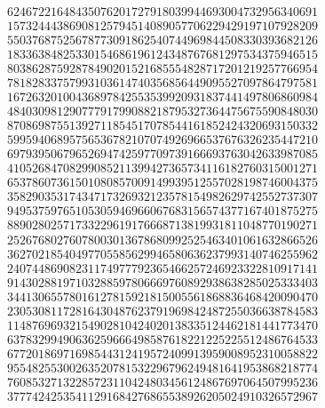 \begin{ProjectEuler}{13}
\begin{multicols}{2}
\begin{align*}
	62467221648435076201727918039944693004732956340691 \\
	15732444386908125794514089057706229429197107928209 \\
	55037687525678773091862540744969844508330393682126 \\
	18336384825330154686196124348767681297534375946515 \\
	80386287592878490201521685554828717201219257766954 \\
	78182833757993103614740356856449095527097864797581 \\
	16726320100436897842553539920931837441497806860984 \\
	48403098129077791799088218795327364475675590848030 \\
	87086987551392711854517078544161852424320693150332 \\
	59959406895756536782107074926966537676326235447210 \\
	69793950679652694742597709739166693763042633987085 \\
	41052684708299085211399427365734116182760315001271 \\
	65378607361501080857009149939512557028198746004375 \\
	35829035317434717326932123578154982629742552737307 \\
	94953759765105305946966067683156574377167401875275 \\
	88902802571733229619176668713819931811048770190271 \\
	25267680276078003013678680992525463401061632866526 \\
	36270218540497705585629946580636237993140746255962 \\
	24074486908231174977792365466257246923322810917141 \\
	91430288197103288597806669760892938638285025333403 \\
	34413065578016127815921815005561868836468420090470 \\
	23053081172816430487623791969842487255036638784583 \\
	11487696932154902810424020138335124462181441773470 \\
	63783299490636259666498587618221225225512486764533 \\
	67720186971698544312419572409913959008952310058822 \\
	95548255300263520781532296796249481641953868218774 \\
	76085327132285723110424803456124867697064507995236 \\
	37774242535411291684276865538926205024910326572967 \\

\end{align*}
\end{multicols}
\end{ProjectEuler}
